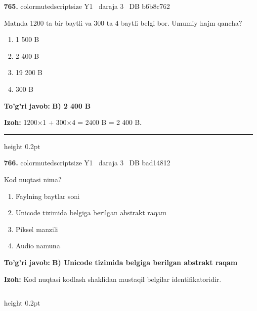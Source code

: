 \documentclass[10pt,a4paper,oneside]{article}
\begin{document}
\noindent\textbf{\color{ink}765.}  {color{muted}scriptsize Y1 \textbullet\ daraja 3 \textbullet\ DB b6b8c762}
\par
Matnda 1200 ta bir baytli va 300 ta 4 baytli belgi bor. Umumiy hajm qancha?
\begin{enumerate}[label=\Alph*),leftmargin=9mm]
\item 1 500 B
\item 2 400 B
\item 19 200 B
\item 300 B
\end{enumerate}
\begin{tcolorbox}[enhanced,breakable,colback=teal!4,colframe=teal!50!black,boxrule=0.5pt,arc=1.1mm,left=3mm,right=3mm,top=1.7mm,bottom=1.7mm,before skip=2mm,after skip=2mm]
\textbf{\color{teal}To'g'ri javob:} \textbf{B) 2 400 B}
\par\smallskip
\textbf{Izoh:} 1200\ensuremath{\times}1 + 300\ensuremath{\times}4 = 2400 B = 2 400 B.
\end{tcolorbox}
\vspace{2mm}\hrule height 0.2pt \vspace{3mm}

\noindent\textbf{\color{ink}766.}  {color{muted}scriptsize Y1 \textbullet\ daraja 3 \textbullet\ DB bad14812}
\par
Kod nuqtasi nima?
\begin{enumerate}[label=\Alph*),leftmargin=9mm]
\item Faylning baytlar soni
\item Unicode tizimida belgiga berilgan abstrakt raqam
\item Piksel manzili
\item Audio namuna
\end{enumerate}
\begin{tcolorbox}[enhanced,breakable,colback=teal!4,colframe=teal!50!black,boxrule=0.5pt,arc=1.1mm,left=3mm,right=3mm,top=1.7mm,bottom=1.7mm,before skip=2mm,after skip=2mm]
\textbf{\color{teal}To'g'ri javob:} \textbf{B) Unicode tizimida belgiga berilgan abstrakt raqam}
\par\smallskip
\textbf{Izoh:} Kod nuqtasi kodlash shaklidan mustaqil belgilar identifikatoridir.
\end{tcolorbox}
\vspace{2mm}\hrule height 0.2pt \vspace{3mm}
\end{document}
